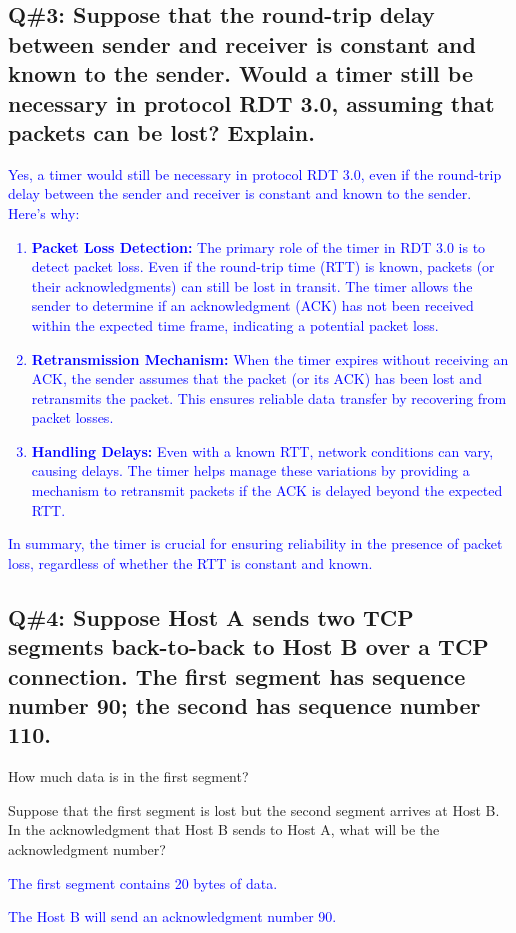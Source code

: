 \subsection*{Q\#3: Suppose that the round-trip delay between sender and receiver is constant and known to the sender. Would a timer still be necessary in protocol RDT 3.0, assuming that packets can be lost? Explain.}
\textcolor{blue}{
Yes, a timer would still be necessary in protocol RDT 3.0, even if the round-trip delay between the sender and receiver is constant and known to the sender. Here's why:
\begin{enumerate}
    \item \textbf{Packet Loss Detection:} The primary role of the timer in RDT 3.0 is to detect packet loss. Even if the round-trip time (RTT) is known, packets (or their acknowledgments) can still be lost in transit. The timer allows the sender to determine if an acknowledgment (ACK) has not been received within the expected time frame, indicating a potential packet loss.
    \item \textbf{Retransmission Mechanism:} When the timer expires without receiving an ACK, the sender assumes that the packet (or its ACK) has been lost and retransmits the packet. This ensures reliable data transfer by recovering from packet losses.
    \item \textbf{Handling Delays:} Even with a known RTT, network conditions can vary, causing delays. The timer helps manage these variations by providing a mechanism to retransmit packets if the ACK is delayed beyond the expected RTT.
\end{enumerate}
In summary, the timer is crucial for ensuring reliability in the presence of packet loss, regardless of whether the RTT is constant and known.
}
\subsection*{Q\#4: Suppose Host A sends two TCP segments back-to-back to Host B over a TCP connection. The first segment has sequence number 90; the second has sequence number 110.}
\begin{itemize}
\item[a)] How much data is in the first segment?
\item[b)] Suppose that the first segment is lost but the second segment arrives at Host B. In the acknowledgment that Host B sends to Host A, what will be the acknowledgment number?
\newline
\textcolor{blue}{
\item[a)] The first segment contains 20 bytes of data.
\item[b)] The Host B will send an acknowledgment number 90.
}
\end{itemize}

